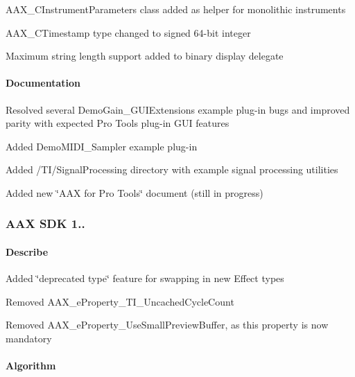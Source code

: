 \begin{DoxyItemize}
\item A\+A\+X\+\_\+\+C\+Instrument\+Parameters class added as helper for monolithic instruments 
\item A\+A\+X\+\_\+\+C\+Timestamp type changed to signed 64-\/bit integer 
\item Maximum string length support added to binary display delegate 
\end{DoxyItemize}\hypertarget{a00847_aax_sdk_1p0p4_Documentation}{}\paragraph{Documentation}\label{a00847_aax_sdk_1p0p4_Documentation}

\begin{DoxyItemize}
\item Resolved several Demo\+Gain\+\_\+\+G\+U\+I\+Extensions example plug-\/in bugs and improved parity with expected Pro Tools plug-\/in G\+UI features 
\item Added Demo\+M\+I\+D\+I\+\_\+\+Sampler example plug-\/in 
\item Added /\+T\+I/\+Signal\+Processing directory with example signal processing utilities 
\item Added new \char`\"{}\+A\+A\+X for Pro Tools\char`\"{} document (still in progress) 
\end{DoxyItemize}\hypertarget{a00847_aax_sdk_1p0p3}{}\subsubsection{A\+A\+X S\+D\+K 1..}\label{a00847_aax_sdk_1p0p3}
\hypertarget{a00847_aax_sdk_1p0p3_Describe}{}\paragraph{Describe}\label{a00847_aax_sdk_1p0p3_Describe}

\begin{DoxyItemize}
\item Added \char`\"{}deprecated type\char`\"{} feature for swapping in new Effect types 
\item Removed A\+A\+X\+\_\+e\+Property\+\_\+\+T\+I\+\_\+\+Uncached\+Cycle\+Count 
\item Removed A\+A\+X\+\_\+e\+Property\+\_\+\+Use\+Small\+Preview\+Buffer, as this property is now mandatory 
\end{DoxyItemize}\hypertarget{a00847_aax_sdk_1p0p3_Algorithm}{}\paragraph{Algorithm}\label{a00847_aax_sdk_1p0p3_Algorithm}

